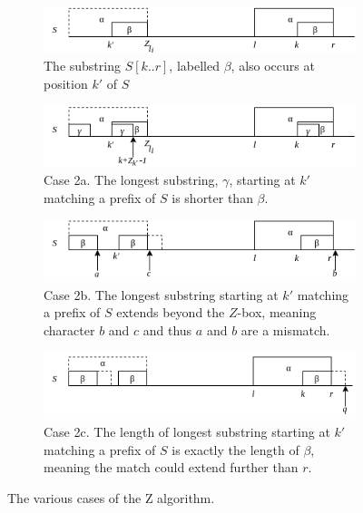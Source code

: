 \begin{figure}[t]
\centering
\begin{subfigure}{0.9\textwidth}
    \includegraphics[width=\textwidth]{LaTeX/Figures/Zalg/Zalg1.png}
    \caption{The substring $S[k..r]$, labelled $\beta$, also occurs at position $k'$ of $S$}
    \label{fig:Zalg1}
\end{subfigure}
\hfill
\begin{subfigure}{0.9\textwidth}
    \includegraphics[width=\textwidth]{LaTeX/Figures/Zalg/Zalg2a.png}
    \caption{Case 2a. The longest substring, $\gamma$, starting at $k'$ matching a prefix of $S$ is shorter than $\beta$. }
    \label{fig:Zalg2a}
\end{subfigure}
\hfill
\begin{subfigure}{0.9\textwidth}
    \includegraphics[width=\textwidth]{LaTeX/Figures/Zalg/Zalg2b.png}
    \caption{Case 2b. The longest substring starting at $k'$ matching a prefix of $S$ extends beyond the $Z$-box, meaning character $b$ and $c$ and thus $a$ and $b$ are a mismatch. }
    \label{fig:Zalg2b}
\end{subfigure}
\hfill
\begin{subfigure}{0.9\textwidth}
    \includegraphics[width=\textwidth]{LaTeX/Figures/Zalg/Zalg2c.png}
    \caption{Case 2c. The length of longest substring starting at $k'$ matching a prefix of $S$ is exactly the length of $\beta$, meaning the match could extend further than $r$. }
    \label{fig:Zalg2c}
\end{subfigure}
\caption{The various cases of the Z algorithm. }
\label{fig:Zalg}
\end{figure}

